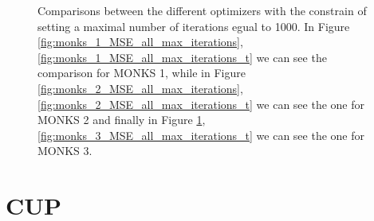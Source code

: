 \begin{figure}[t!]
\begin{subfigure}{0.45\textwidth}
{                    }
                    \caption{}
                    \label{fig:monks_3_MSE_all_max_iterations}
                \end{subfigure}
                \caption{Comparisons between the different optimizers with the constrain of setting a
                maximal number of iterations egual to 1000. In Figure \ref{fig:monks_1_MSE_all_max_iterations}, \ref{fig:monks_1_MSE_all_max_iterations_t}
                we can see the comparison for MONKS 1, while in Figure \ref{fig:monks_2_MSE_all_max_iterations}, \ref{fig:monks_2_MSE_all_max_iterations_t}
                we can see the one for MONKS 2 and finally in Figure \ref{fig:monks_3_MSE_all_max_iterations}, \ref{fig:monks_3_MSE_all_max_iterations_t} we
                can see the one for MONKS 3.}
                \label{fig:monks_MSE_all_max_iterations}
            \end{figure}


    \section{CUP} %
        \label{sec:cup}

        \begin{table}[H]
            \centering
            \begin{subtable}{\textwidth}
            \end{subtable}
            \caption{Comparisons between the iterations for the CUP dataset.}
            \label{tab:cup}
        \end{table}


